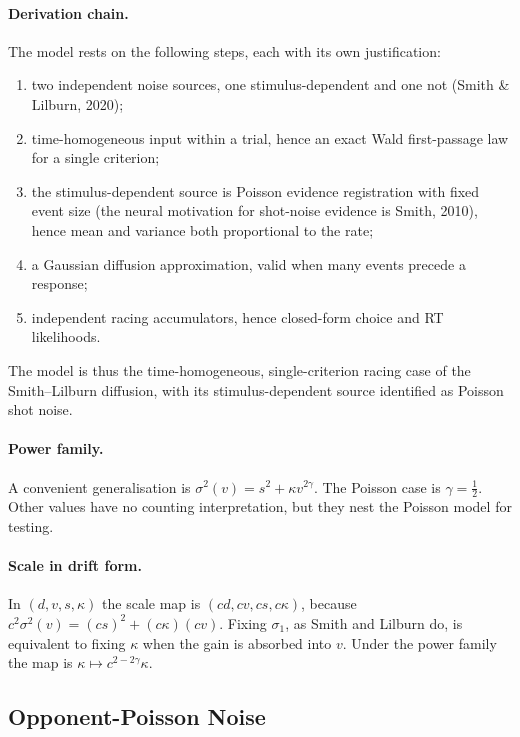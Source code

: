 \documentclass[12pt]{article}
\begin{document}
\paragraph{Derivation chain.}
The model rests on the following steps, each with its own justification:
\begin{enumerate}
  \item two independent noise sources, one stimulus-dependent and one not (Smith \& Lilburn, 2020);
  \item time-homogeneous input within a trial, hence an exact Wald first-passage law for a single criterion;
  \item the stimulus-dependent source is Poisson evidence registration with fixed event size (the neural motivation for shot-noise evidence is Smith,
  2010), hence mean and variance both proportional to the rate;
  \item a Gaussian diffusion approximation, valid when many events precede a response;
  \item independent racing accumulators, hence closed-form choice and RT likelihoods.
\end{enumerate}
The model is thus the time-homogeneous, single-criterion racing case of the Smith--Lilburn diffusion, with its stimulus-dependent source identified as Poisson shot noise.

\paragraph{Power family.}
A convenient generalisation is $\sigma^2(v)=s^2+\kappa v^{2\gamma}$. The Poisson case is $\gamma=\tfrac12$. Other values have no counting interpretation, but they nest the Poisson model for testing.

\paragraph{Scale in drift form.}
In $(d,v,s,\kappa)$ the scale map is $(cd,cv,cs,c\kappa)$, because $c^2\sigma^2(v)=(cs)^2+(c\kappa)(cv)$. Fixing $\sigma_1$, as Smith and Lilburn do, is equivalent to fixing $\kappa$ when the gain is absorbed into $v$. Under the power family the map is $\kappa\mapsto c^{2-2\gamma}\kappa$.

\subsection{Opponent-Poisson Noise}
\label{sec:opponent-poisson}
\end{document}
